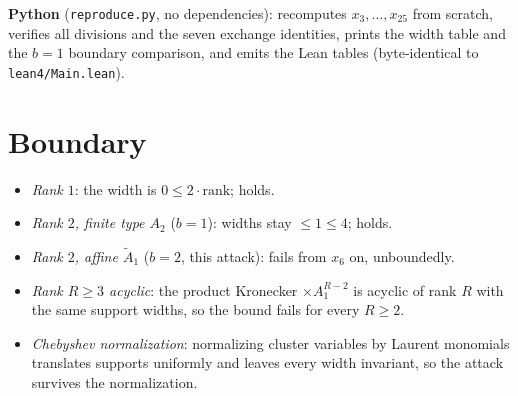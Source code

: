 \documentclass[11pt]{article}
\begin{document}
\textbf{Python} (\texttt{reproduce.py}, no dependencies): recomputes
$x_3,\dots,x_{25}$ from scratch, verifies all divisions and the seven
exchange identities, prints the width table and the $b=1$ boundary
comparison, and emits the Lean tables (byte-identical to
\texttt{lean4/Main.lean}).

\section{Boundary}

\begin{itemize}
\item \emph{Rank $1$}: the width is $0 \le 2\cdot\mathrm{rank}$; holds.
\item \emph{Rank $2$, finite type $A_2$} ($b=1$): widths stay $\le 1 \le 4$;
      holds.
\item \emph{Rank $2$, affine $\widetilde A_1$} ($b=2$, this attack): fails
      from $x_6$ on, unboundedly.
\item \emph{Rank $R \ge 3$ acyclic}: the product Kronecker $\times
      A_1^{R-2}$ is acyclic of rank $R$ with the same support widths, so the
      bound fails for every $R \ge 2$.
\item \emph{Chebyshev normalization}: normalizing cluster variables by
      Laurent monomials translates supports uniformly and leaves every
      width invariant, so the attack survives the normalization.
\end{itemize}
\end{document}
